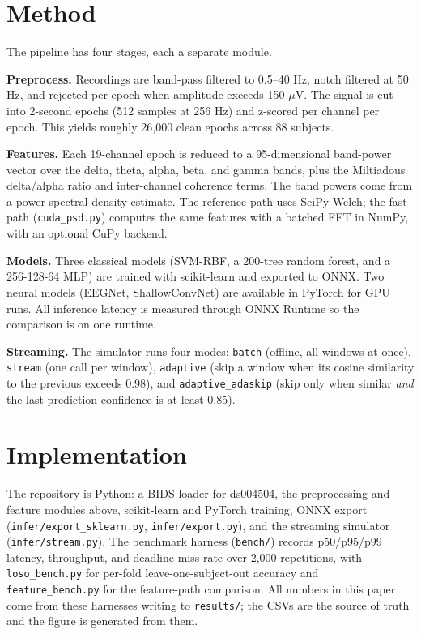 \documentclass[10pt,twocolumn]{article}
\newcommand{\code}[1]{\texttt{#1}}
\begin{document}
\section{Method}
The pipeline has four stages, each a separate module.

\textbf{Preprocess.} Recordings are band-pass filtered to 0.5--40 Hz, notch
filtered at 50 Hz, and rejected per epoch when amplitude exceeds 150 $\mu$V.
The signal is cut into 2-second epochs (512 samples at 256 Hz) and z-scored per
channel per epoch. This yields roughly 26{,}000 clean epochs across 88 subjects.

\textbf{Features.} Each 19-channel epoch is reduced to a 95-dimensional band-power
vector over the delta, theta, alpha, beta, and gamma bands, plus the
Miltiadous delta/alpha ratio and inter-channel coherence terms. The band powers
come from a power spectral density estimate. The reference path uses SciPy Welch;
the fast path (\code{cuda\_psd.py}) computes the same features with a batched FFT
in NumPy, with an optional CuPy backend.

\textbf{Models.} Three classical models (SVM-RBF, a 200-tree random forest, and a
256-128-64 MLP) are trained with scikit-learn and exported to ONNX. Two neural
models (EEGNet, ShallowConvNet) are available in PyTorch for GPU runs. All
inference latency is measured through ONNX Runtime so the comparison is on one
runtime.

\textbf{Streaming.} The simulator runs four modes: \code{batch} (offline, all
windows at once), \code{stream} (one call per window), \code{adaptive} (skip a
window when its cosine similarity to the previous exceeds 0.98), and
\code{adaptive\_adaskip} (skip only when similar \emph{and} the last prediction
confidence is at least 0.85).

\section{Implementation}
The repository is Python: a BIDS loader for ds004504, the preprocessing and
feature modules above, scikit-learn and PyTorch training, ONNX export
(\code{infer/export\_sklearn.py}, \code{infer/export.py}), and the streaming
simulator (\code{infer/stream.py}). The benchmark harness (\code{bench/}) records
p50/p95/p99 latency, throughput, and deadline-miss rate over 2{,}000 repetitions,
with \code{loso\_bench.py} for per-fold leave-one-subject-out accuracy and
\code{feature\_bench.py} for the feature-path comparison. All numbers in this
paper come from these harnesses writing to \code{results/}; the CSVs are the
source of truth and the figure is generated from them.
\end{document}
